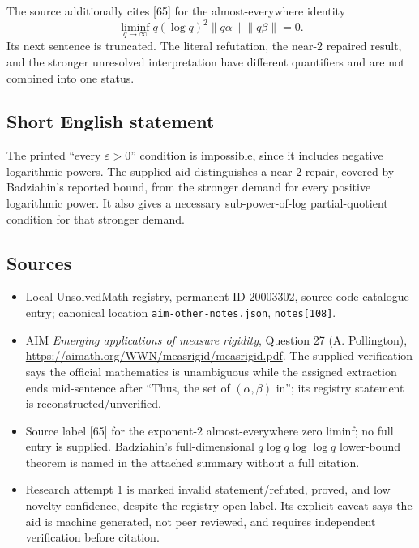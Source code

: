 \documentclass[11pt]{article}
\newcommand{\eps}{\varepsilon}
\begin{document}
The source additionally cites [65] for the almost-everywhere identity
\[
 \liminf_{q\to\infty}q(\log q)^2\|q\alpha\|\|q\beta\|=0.
\]
Its next sentence is truncated. The literal refutation, the near-$2$ repaired result, and the stronger unresolved interpretation have different quantifiers and are not combined into one status.
\subsection{Short English statement}
The printed ``every $\eps>0$'' condition is impossible, since it includes negative logarithmic powers. The supplied aid distinguishes a near-$2$ repair, covered by Badziahin's reported bound, from the stronger demand for every positive logarithmic power. It also gives a necessary sub-power-of-log partial-quotient condition for that stronger demand.
\subsection{Sources}
\begin{itemize}
\item Local UnsolvedMath registry, permanent ID $20003302$, source code catalogue entry; canonical location \texttt{aim-other-notes.json}, \texttt{notes[108]}.
\item AIM \emph{Emerging applications of measure rigidity}, Question 27 (A. Pollington), \url{https://aimath.org/WWN/measrigid/measrigid.pdf}. The supplied verification says the official mathematics is unambiguous while the assigned extraction ends mid-sentence after ``Thus, the set of $(\alpha,\beta)$ in''; its registry statement is reconstructed/unverified.
\item Source label [65] for the exponent-$2$ almost-everywhere zero liminf; no full entry is supplied. Badziahin's full-dimensional $q\log q\log\log q$ lower-bound theorem is named in the attached summary without a full citation.
\item Research attempt 1 is marked invalid statement/refuted, proved, and low novelty confidence, despite the registry open label. Its explicit caveat says the aid is machine generated, not peer reviewed, and requires independent verification before citation.
\end{itemize}
\end{document}
